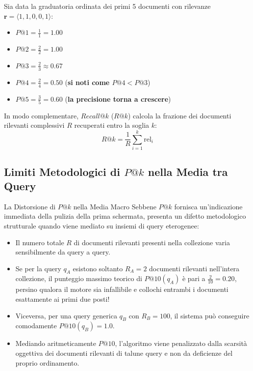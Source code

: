 \begin{example}
Sia data la graduatoria ordinata dei primi 5 documenti con rilevanze $\mathbf{r} = \langle 1, 1, 0, 0, 1 \rangle$:
\begin{itemize}
    \item $P@1 = \frac{1}{1} = 1.00$
    \item $P@2 = \frac{2}{2} = 1.00$
    \item $P@3 = \frac{2}{3} \approx 0.67$
    \item $P@4 = \frac{2}{4} = 0.50$ \quad (\textbf{si noti come $P@4 < P@3$})
    \item $P@5 = \frac{3}{5} = 0.60$ \quad (\textbf{la precisione torna a crescere})
\end{itemize}
\end{example}

In modo complementare, $Recall@k$ ($R@k$) calcola la frazione dei documenti rilevanti complessivi $R$ recuperati entro la soglia $k$:
\begin{equation}
R@k = \frac{1}{R} \sum_{i=1}^k \mathrm{rel}_i
\end{equation}

\FloatBarrier
\subsection{Limiti Metodologici di $P@k$ nella Media tra Query}
\label{subsec:limiti-precision-at-k}

\begin{alertblock}{La Distorsione di $P@k$ nella Media Macro}
Sebbene $P@k$ fornisca un'indicazione immediata della pulizia della prima schermata, presenta un difetto metodologico strutturale quando viene mediato su insiemi di query eterogenee:
\begin{itemize}
    \item Il numero totale $R$ di documenti rilevanti presenti nella collezione varia sensibilmente da query a query.
    \item Se per la query $q_A$ esistono soltanto $R_A = 2$ documenti rilevanti nell'intera collezione, il punteggio massimo teorico di $P@10(q_A)$ \`e pari a $\frac{2}{10} = 0.20$, persino qualora il motore sia infallibile e collochi entrambi i documenti esattamente ai primi due posti!
    \item Viceversa, per una query generica $q_B$ con $R_B = 100$, il sistema può conseguire comodamente $P@10(q_B) = 1.0$.
    \item Mediando aritmeticamente $P@10$, l'algoritmo viene penalizzato dalla scarsit\`a oggettiva dei documenti rilevanti di talune query e non da deficienze del proprio ordinamento.
\end{itemize}
\end{alertblock}

